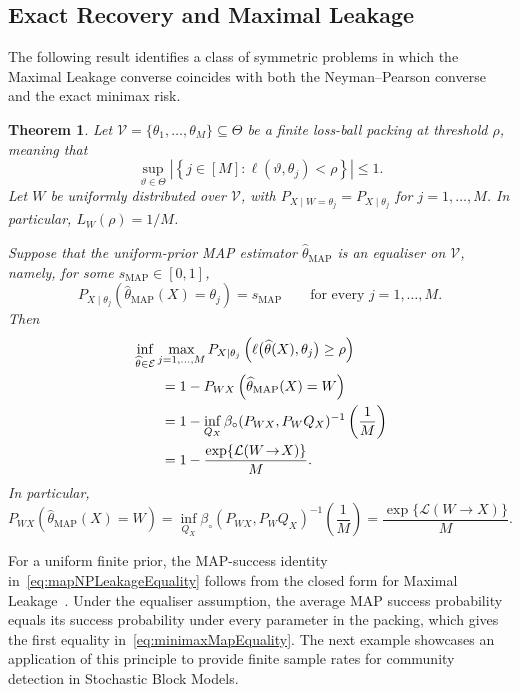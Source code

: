 \documentclass[11pt]{article}
\newtheorem{theorem}{Theorem}[section]
\theoremstyle{definition}
\theoremstyle{remark}
\newcommand{\1}{\boldsymbol{1}}
\newcommand{\ml}[2]{\mathcal{L}(#1\!\to\!#2)}
\begin{document}
\subsection{Exact Recovery and Maximal Leakage}
\label{sec:exact-recovery-maximal-leakage}
The following result identifies a class of symmetric problems in which the
Maximal Leakage converse coincides with both the Neyman--Pearson converse
and the exact minimax risk.
\begin{theorem}
\label{thm:maximalLeakageExact}
Let
\(\mathcal V=\{\theta_1,\ldots,\theta_M\}\subseteq\Theta\)
be a finite loss-ball packing at threshold $\rho$, meaning that
\begin{equation}
\sup_{\vartheta\in\Theta}
\left|
\left\{j\in[M]:\ell(\vartheta,\theta_j)<\rho\right\}
\right|
\leq1.
\label{eq:lossBallPackingDefinition}
\end{equation}
Let $W$ be uniformly distributed over $\mathcal V$, with
\(P_{X\mid W=\theta_j}=P_{X\mid\theta_j}\) for \(j=1,\ldots,M\).
In particular, \(L_W(\rho)=1/M\).

Suppose that the uniform-prior MAP estimator
$\widehat\theta_{\mathrm{MAP}}$ is an equaliser on $\mathcal V$, namely,
for some $s_{\mathrm{MAP}}\in[0,1]$,
\begin{equation}
P_{X\mid\theta_j}
\left(
\widehat\theta_{\mathrm{MAP}}(X)=\theta_j
\right)
=
s_{\mathrm{MAP}}
\qquad
\text{for every }j=1,\ldots,M.
\label{eq:mapEqualizer}
\end{equation}
Then
\begin{align}
&\inf_{\widehat\theta\in\mathcal E}
\max_{j=1,\ldots,M}
P_{X\mid\theta_j}
\left(
\ell\bigl(\widehat\theta(X),\theta_j\bigr)\geq\rho
\right)
\notag\\
&\qquad=
1-
P_{WX}
\left(
\widehat\theta_{\mathrm{MAP}}(X)=W
\right)
\label{eq:minimaxMapEquality}\\
&\qquad=
1-
\inf_{Q_X}
\beta_{\circ}(P_{WX},P_WQ_X)^{-1}
\left(\frac1M\right)
\label{eq:minimaxNPEquality}\\
&\qquad=
1-
\frac{\exp\{\ml{W}{X}\}}{M}.
\label{eq:minimaxLeakageEquality}
\end{align}
In particular,
\begin{equation}
P_{WX}
\left(
\widehat\theta_{\mathrm{MAP}}(X)=W
\right)
=
\inf_{Q_X}
\beta_{\circ}(P_{WX},P_WQ_X)^{-1}
\left(\frac1M\right)
=
\frac{\exp\{\ml{W}{X}\}}{M}.
\label{eq:mapNPLeakageEquality}
\end{equation}
\end{theorem}

For a uniform finite prior, the MAP-success identity in~\eqref{eq:mapNPLeakageEquality} follows from the closed form for Maximal Leakage~\cite{IssaWagnerKamath2020}. Under the equaliser assumption, the average MAP success probability equals its success probability under every parameter in the packing, which gives the first equality in~\eqref{eq:minimaxMapEquality}.
The next example showcases an application of this principle to provide finite sample rates for community detection in Stochastic Block Models.
\end{document}
